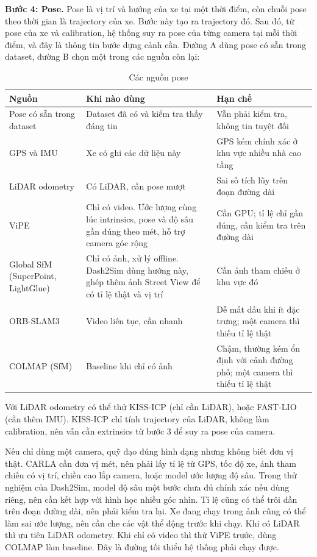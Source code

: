 \textbf{Bước 4: Pose.}
Pose là vị trí và hướng của xe tại một thời điểm, còn chuỗi pose theo thời gian là trajectory của xe.
Bước này tạo ra trajectory đó. Sau đó, từ pose của xe và calibration, hệ thống suy ra pose của từng camera tại mỗi thời điểm, và đây là thông tin bước dựng cảnh cần.
Đường A dùng pose có sẵn trong dataset, đường B chọn một trong các nguồn còn lại:

\begin{table}[H]
  \centering
  \small
  \caption{Các nguồn pose}
  \begin{tabularx}{\linewidth}{>{\raggedright\arraybackslash}p{3.1cm} >{\raggedright\arraybackslash}X >{\raggedright\arraybackslash}X}
    \toprule
    \textbf{Nguồn} & \textbf{Khi nào dùng} & \textbf{Hạn chế} \\
    \midrule
    Pose có sẵn trong dataset & Dataset đã có và kiểm tra thấy đáng tin & Vẫn phải kiểm tra, không tin tuyệt đối \\
    \addlinespace
    GPS và IMU & Xe có ghi các dữ liệu này & GPS kém chính xác ở khu vực nhiều nhà cao tầng \\
    \addlinespace
    LiDAR odometry & Có LiDAR, cần pose mượt & Sai số tích lũy trên đoạn đường dài \\
    \addlinespace
    ViPE & Chỉ có video. Ước lượng cùng lúc intrinsics, pose và độ sâu gần đúng theo mét, hỗ trợ camera góc rộng & Cần GPU; tỉ lệ chỉ gần đúng, cần kiểm tra trên đường dài \\
    \addlinespace
    Global SfM (SuperPoint, LightGlue) & Chỉ có ảnh, xử lý offline. Dash2Sim dùng hướng này, ghép thêm ảnh Street View để có tỉ lệ thật và vị trí & Cần ảnh tham chiếu ở khu vực đó \\
    \addlinespace
    ORB-SLAM3 & Video liên tục, cần nhanh & Dễ mất dấu khi ít đặc trưng; một camera thì thiếu tỉ lệ thật \\
    \addlinespace
    COLMAP (SfM) & Baseline khi chỉ có ảnh & Chậm, thường kém ổn định với cảnh đường phố; một camera thì thiếu tỉ lệ thật \\
    \bottomrule
  \end{tabularx}
\end{table}

Với LiDAR odometry có thể thử KISS-ICP (chỉ cần LiDAR), hoặc FAST-LIO (cần thêm IMU).
KISS-ICP chỉ tính trajectory của LiDAR, không làm calibration, nên vẫn cần extrinsics từ bước 3 để suy ra pose của camera.

Nếu chỉ dùng một camera, quỹ đạo đúng hình dạng nhưng không biết đơn vị thật. CARLA cần đơn vị mét, nên phải lấy tỉ lệ từ GPS, tốc độ xe, ảnh tham chiếu có vị trí, chiều cao lắp camera, hoặc model ước lượng độ sâu. Trong thử nghiệm của Dash2Sim, model độ sâu một bước chưa đủ chính xác nếu dùng riêng, nên cần kết hợp với hình học nhiều góc nhìn. Tỉ lệ cũng có thể trôi dần trên đoạn đường dài, nên phải kiểm tra lại.
Xe đang chạy trong ảnh cũng có thể làm sai ước lượng, nên cần che các vật thể động trước khi chạy.
Khi có LiDAR thì ưu tiên LiDAR odometry. Khi chỉ có video thì thử ViPE trước, dùng COLMAP làm baseline. Đây là đường tối thiểu hệ thống phải chạy được.

